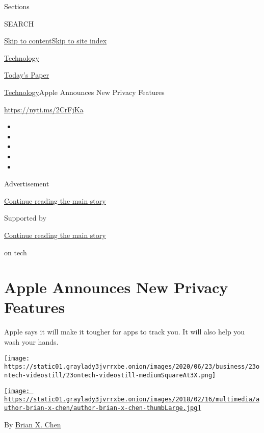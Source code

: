Sections

SEARCH

\protect\hyperlink{site-content}{Skip to
content}\protect\hyperlink{site-index}{Skip to site index}

\href{https://www.nytimes3xbfgragh.onion/section/technology}{Technology}

\href{https://myaccount.nytimes3xbfgragh.onion/auth/login?response_type=cookie\&client_id=vi}{}

\href{https://www.nytimes3xbfgragh.onion/section/todayspaper}{Today's
Paper}

\href{/section/technology}{Technology}\textbar{}Apple Announces New
Privacy Features

\href{https://nyti.ms/2CrFjKa}{https://nyti.ms/2CrFjKa}

\begin{itemize}
\item
\item
\item
\item
\item
\end{itemize}

Advertisement

\protect\hyperlink{after-top}{Continue reading the main story}

Supported by

\protect\hyperlink{after-sponsor}{Continue reading the main story}

on tech

\hypertarget{apple-announces-new-privacy-features}{%
\section{Apple Announces New Privacy
Features}\label{apple-announces-new-privacy-features}}

Apple says it will make it tougher for apps to track you. It will also
help you wash your hands.

\texttt{[image: https://static01.graylady3jvrrxbe.onion/images/2020/06/23/business/23ontech-videostill/23ontech-videostill-mediumSquareAt3X.png]}

\href{https://www.nytimes3xbfgragh.onion/by/brian-x-chen}{\texttt{[image: https://static01.graylady3jvrrxbe.onion/images/2018/02/16/multimedia/author-brian-x-chen/author-brian-x-chen-thumbLarge.jpg]}}

By \href{https://www.nytimes3xbfgragh.onion/by/brian-x-chen}{Brian X.
Chen}

